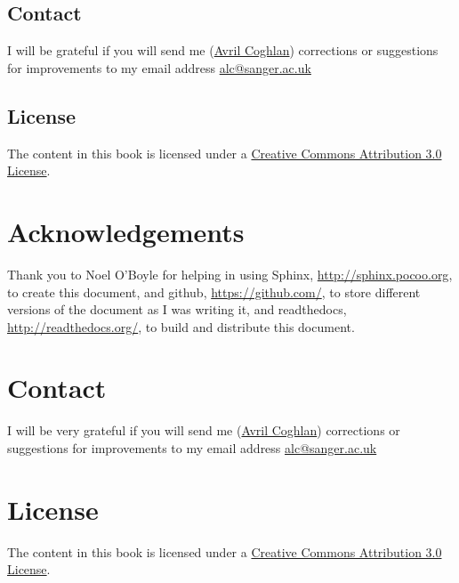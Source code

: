 \documentclass[a4paper,10pt,english]{sphinxmanual}
\begin{document}
\section{Contact}
\label{src/bayesianstats:contact}
I will be grateful if you will send me (\href{http://www.sanger.ac.uk/research/projects/parasitegenomics/}{Avril Coghlan}) corrections or suggestions for improvements to
my email address \href{mailto:alc@sanger.ac.uk}{alc@sanger.ac.uk}


\section{License}
\label{src/bayesianstats:license}
The content in this book is licensed under a \href{http://creativecommons.org/licenses/by/3.0/}{Creative Commons Attribution 3.0 License}.


\chapter{Acknowledgements}
\label{index:acknowledgements}
Thank you to Noel O'Boyle for helping in using Sphinx, \href{http://sphinx.pocoo.org}{http://sphinx.pocoo.org}, to create
this document, and github, \href{https://github.com/}{https://github.com/}, to store different versions of the document
as I was writing it, and readthedocs, \href{http://readthedocs.org/}{http://readthedocs.org/}, to build and distribute
this document.


\chapter{Contact}
\label{index:contact}
I will be very grateful if you will send me (\href{http://www.sanger.ac.uk/research/projects/parasitegenomics/}{Avril Coghlan}) corrections or suggestions for improvements to
my email address \href{mailto:alc@sanger.ac.uk}{alc@sanger.ac.uk}


\chapter{License}
\label{index:license}
The content in this book is licensed under a \href{http://creativecommons.org/licenses/by/3.0/}{Creative Commons Attribution 3.0 License}.



\renewcommand{\indexname}{Index}
\printindex
\end{document}
